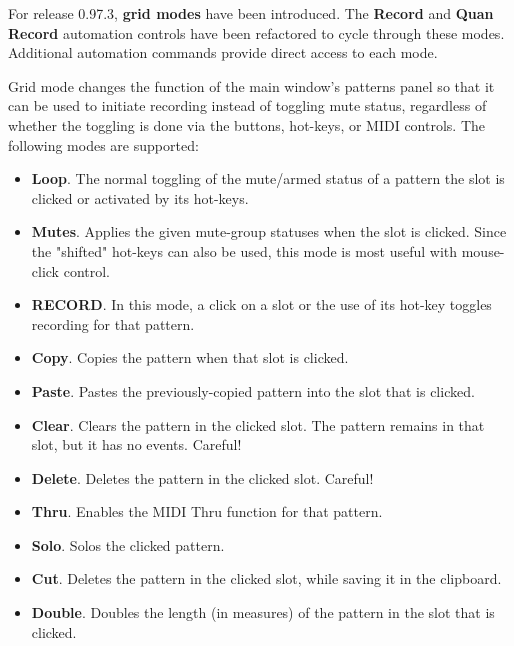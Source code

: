    For release 0.97.3,
   \textbf{grid modes} have been introduced.
   The \textbf{Record} and \textbf{Quan Record} automation controls have been
   refactored to cycle through these modes.
   Additional automation commands provide direct access to each mode.

   Grid mode changes the function of the main window's patterns panel so that
   it can be used to initiate recording instead of toggling mute status,
   regardless of whether the toggling is done via the buttons, hot-keys, or
   MIDI controls.  The following modes are supported:

   \begin{itemize}
      \item \textbf{Loop}.
         The normal toggling of the mute/armed status of
         a pattern the slot is clicked or activated by its hot-keys.
      \item \textbf{Mutes}.
         Applies the given mute-group statuses when
         the slot is clicked. Since the "shifted" hot-keys can also be used,
         this mode is most useful with mouse-click control.
      \item \textbf{RECORD}.
         In this mode, a click on a slot or the use of its hot-key toggles
         recording for that pattern.
      \item \textbf{Copy}.
         Copies the pattern when that slot is clicked.
      \item \textbf{Paste}.
         Pastes the previously-copied pattern into the slot
         that is clicked.
      \item \textbf{Clear}.
         Clears the pattern in the clicked slot.
         The pattern remains in that slot, but it has no events.
         Careful!
      \item \textbf{Delete}.
         Deletes the pattern in the clicked slot.
         Careful!
      \item \textbf{Thru}.
         Enables the MIDI Thru function for that pattern.
      \item \textbf{Solo}.
         Solos the clicked pattern.
      \item \textbf{Cut}.
         Deletes the pattern in the clicked slot, while saving it in
         the clipboard.
      \item \textbf{Double}.
         Doubles the length (in measures) of the pattern in the slot
         that is clicked.
   \end{itemize}

